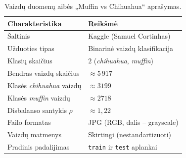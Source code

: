 \begin{table}[H]
    \centering
    \caption{Vaizdų duomenų aibės „Muffin vs Chihuahua“ aprašymas.}
    \begin{tabular}{|l|l|}
        \hline
        Charakteristika & Reikšmė \\
        \hline
        Šaltinis & Kaggle (Samuel Cortinhas) \\ \hline
        Užduoties tipas & Binarinė vaizdų klasifikacija \\ \hline
        Klasių skaičius & $2$ (\textit{chihuahua}, \textit{muffin}) \\ \hline
        Bendras vaizdų skaičius & $\approx 5\,917$ \\ \hline
        Klasės \textit{chihuahua} vaizdų & $\approx 3199$ \\ \hline
        Klasės \textit{muffin} vaizdų & $\approx 2718$ \\ \hline
        Disbalanso santykis $\rho$ & $\approx 1{,}22$ \\ \hline
        Failo formatas & JPG (RGB, dalis – grayscale) \\ \hline
        Vaizdų matmenys & Skirtingi (nestandartizuoti) \\ \hline
        Pradinis padalijimas & \texttt{train} ir \texttt{test} aplankai \\ \hline
    \end{tabular}
    \label{tab:muffin_vs_chihuahua_aprasymas}
\end{table}